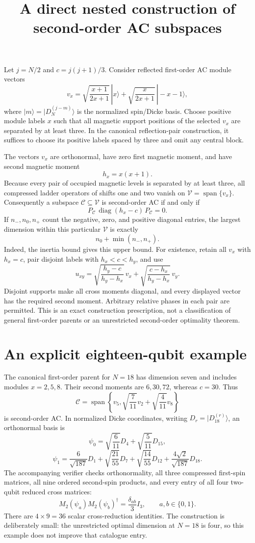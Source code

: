 \documentclass[11pt]{article}
\begin{document}
\title{A direct nested construction of second-order AC subspaces}
\author{}\date{}\maketitle
Let $j=N/2$ and $c=j(j+1)/3$. Consider reflected first-order AC module
vectors
\[
 v_x=\sqrt{\frac{x+1}{2x+1}}\,|x\rangle+
     \sqrt{\frac{x}{2x+1}}\,|-x-1\rangle,
\]
where $|m\rangle=|D_N^{(j-m)}\rangle$ is the normalized spin/Dicke basis.
Choose positive module labels $x$ such that all magnetic support positions
of the selected $v_x$ are separated by at least three. In the canonical
reflection-pair construction, it suffices to choose its positive labels
spaced by three and omit any central block.

The vectors $v_x$ are orthonormal, have zero first magnetic moment, and
have second magnetic moment
\[
 h_x=x(x+1).
\]
Because every pair of occupied magnetic levels is separated by at least
three, all compressed ladder operators of shifts one and two vanish on
$\mathcal V=\operatorname{span}\{v_x\}$. Consequently a subspace
$\mathcal C\subseteq\mathcal V$ is second-order AC if and only if
\[
 P_{\mathcal C}\,\operatorname{diag}(h_x-c)\,P_{\mathcal C}=0.
\]
If $n_-,n_0,n_+$ count the negative, zero, and positive diagonal entries,
the largest dimension within this particular $\mathcal V$ is exactly
\[
 n_0+\min(n_-,n_+).
\]
Indeed, the inertia bound gives this upper bound. For existence, retain
all $v_x$ with $h_x=c$, pair disjoint labels with $h_x<c<h_y$, and use
\[
 u_{xy}=\sqrt{\frac{h_y-c}{h_y-h_x}}\,v_x+
         \sqrt{\frac{c-h_x}{h_y-h_x}}\,v_y.
\]
Disjoint supports make all cross moments diagonal, and every displayed
vector has the required second moment. Arbitrary relative phases in each
pair are permitted. This is an exact construction prescription, not a
classification of general first-order parents or an unrestricted
second-order optimality theorem.

\section*{An explicit eighteen-qubit example}
The canonical first-order parent for $N=18$ has dimension seven and includes
modules $x=2,5,8$. Their second moments are $6,30,72$, whereas $c=30$.
Thus
\[
 \mathcal C=\operatorname{span}\left\{v_5,
       \sqrt{\frac7{11}}v_2+\sqrt{\frac4{11}}v_8\right\}
\]
is second-order AC. In normalized Dicke coordinates, writing
$D_r=|D_{18}^{(r)}\rangle$, an orthonormal basis is
\[
 \psi_0=\sqrt{\frac6{11}}D_4+\sqrt{\frac5{11}}D_{15},
\]
\[
 \psi_1=\frac6{\sqrt{187}}D_1+
     \sqrt{\frac{21}{55}}D_7+
     \sqrt{\frac{14}{55}}D_{12}+
     \frac{4\sqrt2}{\sqrt{187}}D_{18}.
\]
The accompanying verifier checks orthonormality, all three compressed
first-spin matrices, all nine ordered second-spin products, and every
entry of all four two-qubit reduced cross matrices:
\[
 M_2(\psi_a)M_2(\psi_b)^\dagger=\frac{\delta_{ab}}3 I_3,
 \qquad a,b\in\{0,1\}.
\]
There are $4\times9=36$ scalar cross-reduction identities. The construction
is deliberately small: the unrestricted optimal dimension at $N=18$ is
four, so this example does not improve that catalogue entry.
\end{document}
